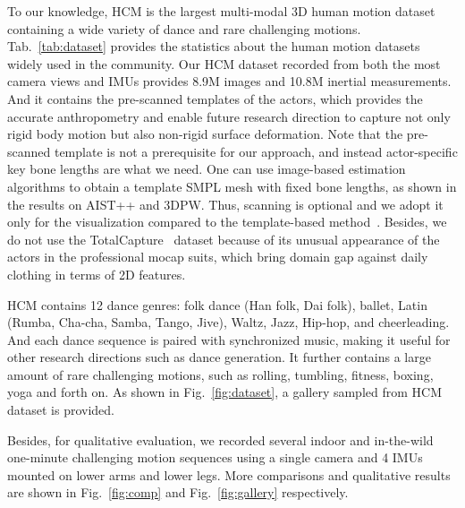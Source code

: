 \documentclass[letterpaper]{article} \usepackage{aaai23}  \usepackage{times}  \usepackage{helvet}  \usepackage{courier}  \usepackage[hyphens]{url}  \usepackage{graphicx} \urlstyle{rm} \def\UrlFont{\rm}  \usepackage{natbib}  \usepackage{caption} \frenchspacing  \setlength{\pdfpagewidth}{8.5in}  \setlength{\pdfpageheight}{11in}  \usepackage{algorithm}
\begin{document}
To our knowledge, HCM is the largest multi-modal 3D human motion dataset containing a wide variety of dance and rare challenging motions. 
Tab.~\ref{tab:dataset} provides the statistics about the human motion datasets widely used in the community. 
Our HCM dataset recorded from both the most camera views and IMUs provides 8.9M images and 10.8M inertial measurements. 
And it contains the pre-scanned templates of the actors, which provides the accurate anthropometry and enable future research direction to capture not only rigid body motion but also non-rigid surface deformation.
Note that the pre-scanned template is not a prerequisite for our approach, and instead actor-specific key bone lengths are what we need. One can use image-based estimation algorithms to obtain a template SMPL mesh with fixed bone lengths, as shown in the results on AIST++ and 3DPW. Thus, scanning is optional and we adopt it only for the visualization compared to the template-based method~\cite{challencap}.
Besides, we do not use the TotalCapture~\cite{TotalCapture} dataset because of its unusual appearance of the actors in the professional mocap suits, which bring domain gap against daily clothing in terms of 2D features.



HCM contains 12 dance genres: folk dance (Han folk, Dai folk), ballet, Latin (Rumba, Cha-cha, Samba, Tango, Jive), Waltz, Jazz, Hip-hop, and cheerleading. And each dance sequence is paired with synchronized music, making it useful for other research directions such as dance generation.
It further contains a large amount of rare challenging motions, such as rolling, tumbling, fitness, boxing, yoga and forth on. 
As shown in Fig.~\ref{fig:dataset}, a gallery sampled from HCM dataset is provided.

\vspace{-1pt}
Besides, for qualitative evaluation, we recorded several indoor and in-the-wild one-minute challenging motion sequences using a single camera and 4 IMUs mounted on lower arms and lower legs. 
More comparisons and qualitative results are shown in Fig.~\ref{fig:comp} and Fig.~\ref{fig:gallery} respectively.


  
\end{document}
